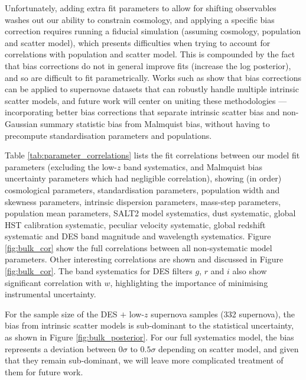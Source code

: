 \documentclass[a4paper,fleqn,usenatbib]{mnras}
\newcommand{\gten}{\citetalias{Guy2010}}
\newcommand{\celeven}{\citetalias{Chotard2011}}
\begin{document}
Unfortunately, adding extra fit parameters to allow for shifting observables washes out our ability to constrain cosmology, and applying a specific bias correction requires running a fiducial simulation (assuming cosmology, population and scatter model), which presents difficulties when trying to account for correlations with population and scatter model. This is compounded by the fact that bias corrections do not in general improve fits (increase the log posterior), and so are difficult to fit parametrically. Works such as \citet{Kessler2017} show that bias corrections can be applied to supernovae datasets that can robustly handle multiple intrinsic scatter models, and future work will center on uniting these methodologies --- incorporating better bias corrections that separate intrinsic scatter bias and non-Gaussian summary statistic bias from Malmquist bias, without having to precompute standardisation parameters and populations.




Table \ref{tab:parameter_correlations} lists the fit correlations between our model fit parameters (excluding the low-$z$ band systematics, and Malmquist bias uncertainty parameters which had negligible correlation), showing (in order) cosmological parameters, standardisation parameters, population width and skewness parameters, intrinsic dispersion parameters, mass-step parameters, population mean parameters, SALT2 model systematics, dust systematic, global HST calibration systematic, peculiar velocity systematic, global redshift systematic and DES band magnitude and wavelength systematics. Figure \ref{fig:bulk_cor} show the full correlations between all non-systematic model parameters. Other interesting correlations are shown and discussed in Figure \ref{fig:bulk_cor}. The band systematics for DES filters $g$, $r$ and $i$ also show significant correlation with $w$, highlighting the importance of minimising instrumental uncertainty.


For the sample size of the DES $+$ low-$z$ supernova samples (332 supernova), the bias from intrinsic scatter models is sub-dominant to the statistical uncertainty, as shown in Figure \ref{fig:bulk_posterior}. For our full systematics model, the bias represents a deviation between $0\sigma$ to $0.5\sigma$ depending on scatter model, and given that they remain sub-dominant, we will leave more complicated treatment of them for future work.
\end{document}

